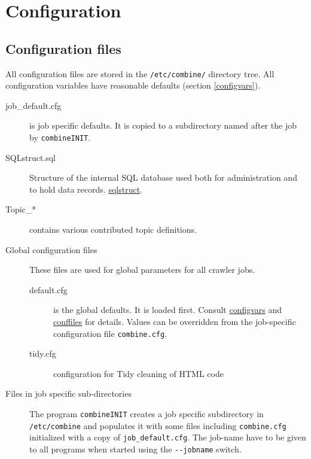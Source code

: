 \section{Configuration}
\label{configuration}
\subsection{Configuration files}
All configuration files are stored in the {\tt /etc/combine/}
directory tree. All configuration variables have reasonable defaults (section \ref{configvars}).

\begin{description}
\item[job\_default.cfg] is job specific defaults. It is copied to a
subdirectory named after the job by {\tt combineINIT}.

\item[SQLstruct.sql]
Structure of the internal SQL database used both for administration
and to hold data records. \hyperref{Details}{Details in section }{}{sqlstruct}.

\item[Topic\_*] contains various contributed topic definitions.

\item[Global configuration files] These files are used for global
parameters for all crawler jobs.
\begin{description}

\item[default.cfg] is the global defaults. It is loaded first.
Consult \hyperref{'Configuration Variables'}{section }{}{configvars}
and \hyperref{'Default configuration files'}{appendix }{}{conffiles} for details.
Values can be overridden from
the job-specific configuration file {\tt combine.cfg}.

\item[tidy.cfg] configuration for Tidy cleaning of HTML code

\end{description}

\item[Files in job specific sub-directories]
The program {\tt combineINIT} creates
a job specific subdirectory in {\tt /etc/combine} and populates it with some files including {\tt combine.cfg}
initialized with a copy of {\tt job\_default.cfg}.
The job-name have to be given to all programs
when started using the \verb+--jobname+ switch. 

\begin{description}


\end{description}
\end{description}
